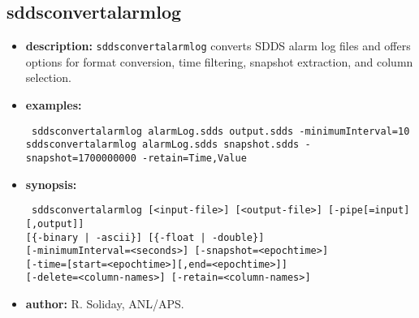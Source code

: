 \newpage
\subsection{sddsconvertalarmlog}
\label{sddsconvertalarmlog}

\begin{itemize}
\item {\bf description:} \verb|sddsconvertalarmlog| converts SDDS alarm log files and offers options for format conversion,
  time filtering, snapshot extraction, and column selection.
\item {\bf examples:}
\begin{flushleft}{\tt
sddsconvertalarmlog alarmLog.sdds output.sdds -minimumInterval=10\\
sddsconvertalarmlog alarmLog.sdds snapshot.sdds -snapshot=1700000000 -retain=Time,Value
}\end{flushleft}
\item {\bf synopsis:}
\begin{flushleft}{\tt
sddsconvertalarmlog [<input-file>] [<output-file>] [-pipe[=input][,output]] \\
{}[\{-binary | -ascii\}] [\{-float | -double\}] \\
{}[-minimumInterval=<seconds>] [-snapshot=<epochtime>] \\
{}[-time=[start=<epochtime>][,end=<epochtime>]] \\
{}[-delete=<column-names>] [-retain=<column-names>]
}\end{flushleft}
\item {\bf author:} R. Soliday, ANL/APS.
\end{itemize}

